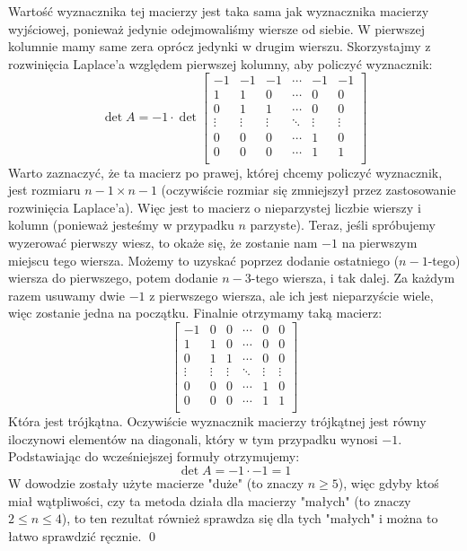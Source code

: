 \documentclass[11pt]{article}
\begin{document}
Wartość wyznacznika tej macierzy jest taka sama jak wyznacznika macierzy wyjściowej, ponieważ jedynie odejmowaliśmy wiersze od siebie. W pierwszej kolumnie mamy same zera oprócz jedynki w drugim wierszu. Skorzystajmy z rozwinięcia Laplace'a względem pierwszej kolumny, aby policzyć wyznacznik:
$$\det A = -1 \cdot \det 
\begin{bmatrix}
-1 & -1 & -1 & \cdots & -1 & -1\\
1 & 1 & 0 & \cdots & 0 & 0\\
0 & 1 & 1 & \cdots & 0 & 0\\
\vdots & \vdots & \vdots & \ddots & \vdots & \vdots \\
0 & 0 & 0 & \cdots & 1 & 0 \\
0 & 0 & 0 & \cdots & 1 & 1 \\
\end{bmatrix}$$
Warto zaznaczyć, że ta macierz po prawej, której chcemy policzyć wyznacznik, jest rozmiaru $n - 1 \times n - 1$ (oczywiście rozmiar się zmniejszył przez zastosowanie rozwinięcia Laplace'a). Więc jest to macierz o nieparzystej liczbie wierszy i kolumn (ponieważ jesteśmy w przypadku $n$ parzyste). Teraz, jeśli spróbujemy wyzerować pierwszy wiesz, to okaże się, że zostanie nam $-1$ na pierwszym miejscu tego wiersza. Możemy to uzyskać poprzez dodanie ostatniego ($n - 1$-tego) wiersza do pierwszego, potem dodanie $n - 3$-tego wiersza, i tak dalej. Za każdym razem usuwamy dwie $-1$ z pierwszego wiersza, ale ich jest nieparzyście wiele, więc zostanie jedna na początku. Finalnie otrzymamy taką macierz:
$$
\begin{bmatrix}
-1 & 0 & 0 & \cdots & 0 & 0\\
1 & 1 & 0 & \cdots & 0 & 0\\
0 & 1 & 1 & \cdots & 0 & 0\\
\vdots & \vdots & \vdots & \ddots & \vdots & \vdots \\
0 & 0 & 0 & \cdots & 1 & 0 \\
0 & 0 & 0 & \cdots & 1 & 1 \\
\end{bmatrix}
$$
Która jest trójkątna. Oczywiście wyznacznik macierzy trójkątnej jest równy iloczynowi elementów na diagonali, który w tym przypadku wynosi $-1$. Podstawiając do wcześniejszej formuły otrzymujemy:
$$\det A = -1 \cdot -1 = 1$$
W dowodzie zostały użyte macierze "duże" (to znaczy 
$n \geq 5$), więc gdyby ktoś miał wątpliwości, czy ta metoda działa dla macierzy "małych" (to znaczy $2 \leq n \leq 4$), to ten rezultat również sprawdza się dla tych "małych" i można to łatwo sprawdzić ręcznie. \qed 
\end{document}
